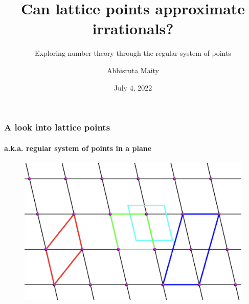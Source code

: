 \documentclass{beamer}
\title[Lattices and Number Theory]{Can lattice points approximate irrationals?}
\subtitle[]{Exploring number theory through the regular system of points}
\author[Abhisruta Maity]{Abhisruta Maity}
\institute{21MS, IISER Kolkata}
\date{July 4, 2022}
\begin{document}
    \begin{frame}
        \titlepage
    \end{frame}

    \begin{frame}
        \frametitle{A look into lattice points}
        \framesubtitle{a.k.a. regular system of points in a plane}
        \begin{figure}
            \includegraphics[scale=0.40]{latt.png}
        \end{figure}

    \end{frame}
\end{document}
